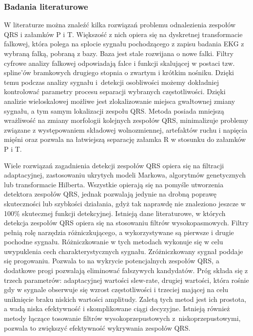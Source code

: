 \documentclass[a4paper, 11pt]{article}
\begin{document}
\subsubsection{Badania literaturowe}
\label{sec:waves:papers}
W literaturze można znaleźć kilka rozwiązań problemu odnalezienia zespołów QRS i załamków P i T. Większość z nich opiera się na dyskretnej transformacie falkowej, która polega na splocie
sygnału pochodzącego z zapisu badania EKG z wybraną falką, pobraną z bazy. Baza jest stale rozwijana o nowe falki. Filtry cyfrowe analizy falkowej odpowiadają falce i funkcji skalującej w postaci tzw.
spline’ów bramkowych drugiego stopnia o zwartym i krótkim nośniku. Dzięki temu
podczas analizy sygnału i~detekcji osobliwości możemy dokładniej kontrolować parametry
procesu separacji wybranych częstotliwości. Dzięki analizie wieloskalowej możliwe jest
zlokalizowanie miejsca gwałtownej zmiany sygnału, a tym samym lokalizacji zespołu QRS.
Metoda posiada mniejszą wrażliwość na zmiany morfologii kolejnych zespołów QRS,
minimalizuje problemy związane z występowaniem składowej wolnozmiennej, artefaktów
ruchu i napięcia mięśni oraz pozwala na łatwiejszą separację załamka R w stosunku do
załamków P i T.

Wiele rozwiązań zagadnienia detekcji zespołów QRS opiera się na filtracji adaptacyjnej,
zastosowaniu ukrytych modeli Markowa, algorytmów genetycznych lub
transformacie Hilberta. Wszystkie opierają się na pomyśle utworzenia detektora zespołów QRS, jednak pozwalają jedynie na drobną poprawę
skuteczności lub szybkości działania, gdyż tak naprawdę nie znaleziono jeszcze w 100\% skutecznej funkcji detekcyjnej. 
Istnieją dane literaturowe, w których detekcja zespołów QRS opiera się na stosowaniu filtrów wysokopasmowych. Filtry pełnią rolę narzędzia różniczkującego, a wykorzystywane są pierwsze i drugie pochodne sygnału. Różniczkowanie w tych metodach wykonuje się w celu uwypuklenia cech charakterystycznych sygnału. Zróżniczkowany sygnał poddaje się progowaniu. Pozwala to na wykrycie potencjalnych zespołów QRS, a dodatkowe progi pozwalają eliminować fałszywych kandydatów. Próg składa się z trzech parametrów: adaptacyjnej wartości slew-rate, drugiej wartości, która rośnie gdy w sygnale obserwuje się wzrost częstotliwości i trzeciej mającej na celu uniknięcie braku niskich wartości amplitudy. Zaletą tych metod jest ich prostota, a wadą niska efektywność i skomplikowane ciągi decyzyjne. Istnieją również metody łączące tosowanie filtrów wysokoprzepustowych z~niskoprzepustowymi, pozwala to zwiększyć efektywność wykrywania zespołów QRS.
\end{document}
